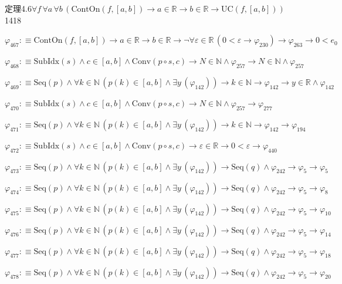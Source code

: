\begin{fullproof}{定理4.6}{$\forall f\,\forall a\,\forall b\,(\mathrm{ContOn}(f,[a,b]) \to a \in \mathbb{R} \to b \in \mathbb{R} \to \mathrm{UC}(f,[a,b]))$}{1418}
\begin{abbrevlist}
\item $\varphi_{467} :\equiv \mathrm{ContOn}(f,[a,b]) \to a \in \mathbb{R} \to b \in \mathbb{R} \to \neg \forall \varepsilon \in \mathbb{R}\,(0 < \varepsilon \to \varphi_{230}) \to \varphi_{263} \to 0 < e_{0}$
\item $\varphi_{468} :\equiv \mathrm{SubIdx}(s) \land c \in [a,b] \land \mathrm{Conv}(p \circ s,c) \to N \in \mathbb{N} \land \varphi_{257} \to N \in \mathbb{N} \land \varphi_{257}$
\item $\varphi_{469} :\equiv \mathrm{Seq}(p) \land \forall k \in \mathbb{N}\,(p(k) \in [a,b] \land \exists y\,(\varphi_{142})) \to k \in \mathbb{N} \to \varphi_{142} \to y \in \mathbb{R} \land \varphi_{142}$
\item $\varphi_{470} :\equiv \mathrm{SubIdx}(s) \land c \in [a,b] \land \mathrm{Conv}(p \circ s,c) \to N \in \mathbb{N} \land \varphi_{257} \to \varphi_{277}$
\item $\varphi_{471} :\equiv \mathrm{Seq}(p) \land \forall k \in \mathbb{N}\,(p(k) \in [a,b] \land \exists y\,(\varphi_{142})) \to k \in \mathbb{N} \to \varphi_{142} \to \varphi_{194}$
\item $\varphi_{472} :\equiv \mathrm{SubIdx}(s) \land c \in [a,b] \land \mathrm{Conv}(p \circ s,c) \to \varepsilon \in \mathbb{R} \to 0 < \varepsilon \to \varphi_{440}$
\item $\varphi_{473} :\equiv \mathrm{Seq}(p) \land \forall k \in \mathbb{N}\,(p(k) \in [a,b] \land \exists y\,(\varphi_{142})) \to \mathrm{Seq}(q) \land \varphi_{242} \to \varphi_{5} \to \varphi_{5}$
\item $\varphi_{474} :\equiv \mathrm{Seq}(p) \land \forall k \in \mathbb{N}\,(p(k) \in [a,b] \land \exists y\,(\varphi_{142})) \to \mathrm{Seq}(q) \land \varphi_{242} \to \varphi_{5} \to \varphi_{8}$
\item $\varphi_{475} :\equiv \mathrm{Seq}(p) \land \forall k \in \mathbb{N}\,(p(k) \in [a,b] \land \exists y\,(\varphi_{142})) \to \mathrm{Seq}(q) \land \varphi_{242} \to \varphi_{5} \to \varphi_{10}$
\item $\varphi_{476} :\equiv \mathrm{Seq}(p) \land \forall k \in \mathbb{N}\,(p(k) \in [a,b] \land \exists y\,(\varphi_{142})) \to \mathrm{Seq}(q) \land \varphi_{242} \to \varphi_{5} \to \varphi_{14}$
\item $\varphi_{477} :\equiv \mathrm{Seq}(p) \land \forall k \in \mathbb{N}\,(p(k) \in [a,b] \land \exists y\,(\varphi_{142})) \to \mathrm{Seq}(q) \land \varphi_{242} \to \varphi_{5} \to \varphi_{18}$
\item $\varphi_{478} :\equiv \mathrm{Seq}(p) \land \forall k \in \mathbb{N}\,(p(k) \in [a,b] \land \exists y\,(\varphi_{142})) \to \mathrm{Seq}(q) \land \varphi_{242} \to \varphi_{5} \to \varphi_{20}$

\end{abbrevlist}
\end{fullproof}

